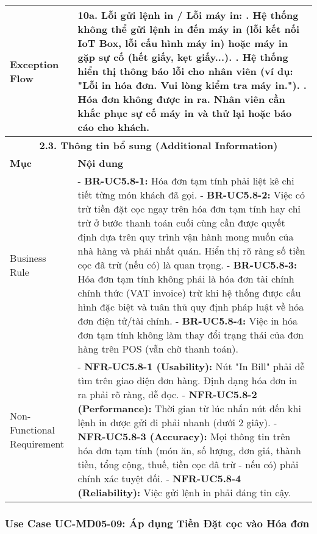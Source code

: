 \begin{longtable}{|m{4cm}|p{11cm}|}
\hline
Exception Flow & \textbf{10a. Lỗi gửi lệnh in / Lỗi máy in:} \newline    1. Hệ thống không thể gửi lệnh in đến máy in (lỗi kết nối IoT Box, lỗi cấu hình máy in) hoặc máy in gặp sự cố (hết giấy, kẹt giấy...). \newline    2. Hệ thống hiển thị thông báo lỗi cho nhân viên (ví dụ: "Lỗi in hóa đơn. Vui lòng kiểm tra máy in."). \newline    3. Hóa đơn không được in ra. Nhân viên cần khắc phục sự cố máy in và thử lại hoặc báo cáo cho khách. \\
\hline
\multicolumn{2}{|c|}{\textbf{2.3. Thông tin bổ sung (Additional Information)}} \\
\hline
\textbf{Mục} & \textbf{Nội dung} \\
\hline
Business Rule & - \textbf{BR-UC5.8-1:} Hóa đơn tạm tính phải liệt kê chi tiết từng món khách đã gọi. \newline - \textbf{BR-UC5.8-2:} Việc có trừ tiền đặt cọc ngay trên hóa đơn tạm tính hay chỉ trừ ở bước thanh toán cuối cùng cần được quyết định dựa trên quy trình vận hành mong muốn của nhà hàng và phải nhất quán. Hiển thị rõ ràng số tiền cọc đã trừ (nếu có) là quan trọng. \newline - \textbf{BR-UC5.8-3:} Hóa đơn tạm tính không phải là hóa đơn tài chính chính thức (VAT invoice) trừ khi hệ thống được cấu hình đặc biệt và tuân thủ quy định pháp luật về hóa đơn điện tử/tài chính. \newline - \textbf{BR-UC5.8-4:} Việc in hóa đơn tạm tính không làm thay đổi trạng thái của đơn hàng trên POS (vẫn chờ thanh toán). \\
\hline
Non-Functional Requirement & - \textbf{NFR-UC5.8-1 (Usability):} Nút "In Bill" phải dễ tìm trên giao diện đơn hàng. Định dạng hóa đơn in ra phải rõ ràng, dễ đọc. \newline - \textbf{NFR-UC5.8-2 (Performance):} Thời gian từ lúc nhấn nút đến khi lệnh in được gửi đi phải nhanh (dưới 2 giây). \newline - \textbf{NFR-UC5.8-3 (Accuracy):} Mọi thông tin trên hóa đơn tạm tính (món ăn, số lượng, đơn giá, thành tiền, tổng cộng, thuế, tiền cọc đã trừ - nếu có) phải chính xác tuyệt đối. \newline - \textbf{NFR-UC5.8-4 (Reliability):} Việc gửi lệnh in phải đáng tin cậy. \\
\hline
\end{longtable}

\subsubsection{Use Case UC-MD05-09: Áp dụng Tiền Đặt cọc vào Hóa đơn}

